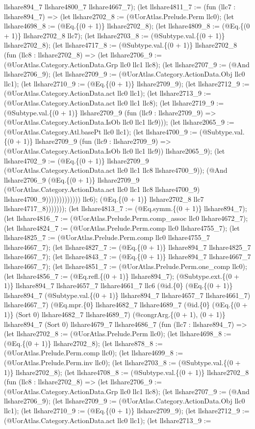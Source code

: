 \documentclass[11pt]{article}
\begin{document}
llshare894\_7 llshare4800\_7 llshare4667\_7); (let llshare4811\_7 := (fun (llc7 : llshare894\_7) => (let llshare2702\_8 := (@UorAtlas.Prelude.Perm llc0); (let llshare4698\_8 := (@Eq.\{(0 + 1)\} llshare2702\_8); (let llshare4809\_8 := (@Eq.\{(0 + 1)\} llshare2702\_8 llc7); (let llshare2703\_8 := (@Subtype.val.\{(0 + 1)\} llshare2702\_8); (let llshare4717\_8 := (@Subtype.val.\{(0 + 1)\} llshare2702\_8 (fun (llc8 : llshare2702\_8) => (let llshare2706\_9 := (@UorAtlas.Category.ActionData.Grp llc0 llc1 llc8); (let llshare2707\_9 := (@And llshare2706\_9); (let llshare2709\_9 := (@UorAtlas.Category.ActionData.Obj llc0 llc1); (let llshare2710\_9 := (@Eq.\{(0 + 1)\} llshare2709\_9); (let llshare2712\_9 := (@UorAtlas.Category.ActionData.act llc0 llc1); (let llshare2713\_9 := (@UorAtlas.Category.ActionData.act llc0 llc1 llc8); (let llshare2719\_9 := (@Subtype.val.\{(0 + 1)\} llshare2709\_9 (fun (llc9 : llshare2709\_9) => (@UorAtlas.Category.ActionData.IsOb llc0 llc1 llc9))); (let llshare2065\_9 := (@UorAtlas.Category.Atl.basePt llc0 llc1); (let llshare4700\_9 := (@Subtype.val.\{(0 + 1)\} llshare2709\_9 (fun (llc9 : llshare2709\_9) => (@UorAtlas.Category.ActionData.IsOb llc0 llc1 llc9)) llshare2065\_9); (let llshare4702\_9 := (@Eq.\{(0 + 1)\} llshare2709\_9 (@UorAtlas.Category.ActionData.act llc0 llc1 llc8 llshare4700\_9)); (@And llshare2706\_9 (@Eq.\{(0 + 1)\} llshare2709\_9 (@UorAtlas.Category.ActionData.act llc0 llc1 llc8 llshare4700\_9) llshare4700\_9))))))))))))) llc6); (@Eq.\{(0 + 1)\} llshare2702\_8 llc7 llshare4717\_8))))))); (let llshare4813\_7 := (@Eq.symm.\{(0 + 1)\} llshare894\_7); (let llshare4816\_7 := (@UorAtlas.Prelude.Perm.comp\_assoc llc0 llshare4672\_7); (let llshare4824\_7 := (@UorAtlas.Prelude.Perm.comp llc0 llshare4755\_7); (let llshare4825\_7 := (@UorAtlas.Prelude.Perm.comp llc0 llshare4755\_7 llshare4667\_7); (let llshare4827\_7 := (@Eq.\{(0 + 1)\} llshare894\_7 llshare4825\_7 llshare4667\_7); (let llshare4843\_7 := (@Eq.\{(0 + 1)\} llshare894\_7 llshare4667\_7 llshare4667\_7); (let llshare4851\_7 := (@UorAtlas.Prelude.Perm.one\_comp llc0); (let llshare4856\_7 := (@Eq.refl.\{(0 + 1)\} llshare894\_7); (@Subtype.ext.\{(0 + 1)\} llshare894\_7 llshare4657\_7 llshare4661\_7 llc6 (@id.\{0\} (@Eq.\{(0 + 1)\} llshare894\_7 (@Subtype.val.\{(0 + 1)\} llshare894\_7 llshare4657\_7 llshare4661\_7) llshare4667\_7) (@Eq.mpr.\{0\} llshare4682\_7 llshare4689\_7 (@id.\{0\} (@Eq.\{(0 + 1)\} (Sort 0) llshare4682\_7 llshare4689\_7) (@congrArg.\{(0 + 1), (0 + 1)\} llshare894\_7 (Sort 0) llshare4679\_7 llshare4686\_7 (fun (llc7 : llshare894\_7) => (let llshare2702\_8 := (@UorAtlas.Prelude.Perm llc0); (let llshare4698\_8 := (@Eq.\{(0 + 1)\} llshare2702\_8); (let llshare878\_8 := (@UorAtlas.Prelude.Perm.comp llc0); (let llshare4699\_8 := (@UorAtlas.Prelude.Perm.inv llc0); (let llshare2703\_8 := (@Subtype.val.\{(0 + 1)\} llshare2702\_8); (let llshare4708\_8 := (@Subtype.val.\{(0 + 1)\} llshare2702\_8 (fun (llc8 : llshare2702\_8) => (let llshare2706\_9 := (@UorAtlas.Category.ActionData.Grp llc0 llc1 llc8); (let llshare2707\_9 := (@And llshare2706\_9); (let llshare2709\_9 := (@UorAtlas.Category.ActionData.Obj llc0 llc1); (let llshare2710\_9 := (@Eq.\{(0 + 1)\} llshare2709\_9); (let llshare2712\_9 := (@UorAtlas.Category.ActionData.act llc0 llc1); (let llshare2713\_9 := 
\end{document}

